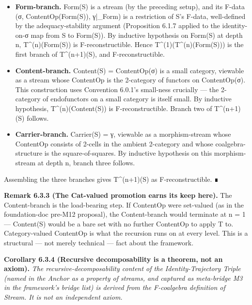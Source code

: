 \documentclass[11pt, openany]{book}
\begin{document}
\begin{itemize}
\item \textbf{Form-branch.} Form(S) is a stream (by the preceding setup), and its F-data (σ, ContentOp(Form(S)), γ|\_\allowbreak{}Form) is a restriction of S's F-data, well-defined by the adequacy-stability argument (Proposition 6.1.7 applied to the identity-on-σ map from S to Form(S)). By inductive hypothesis on Form(S) at depth n, T\textasciicircum{}(n)(Form(S)) is F-reconstructible. Hence T\textasciicircum{}(1)(T\textasciicircum{}(n)(Form(S))) is the first branch of T\textasciicircum{}(n+1)(S), and F-reconstructible.

\item \textbf{Content-branch.} Content(S) = ContentOp(σ) is a small category, viewable as a stream whose ContentOp is the 2-category of functors on ContentOp(σ). This construction uses Convention 6.0.1's small-ness crucially --- the 2-category of endofunctors on a small category is itself small. By inductive hypothesis, T\textasciicircum{}(n)(Content(S)) is F-reconstructible. Branch two of T\textasciicircum{}(n+1)(S) follows.

\item \textbf{Carrier-branch.} Carrier(S) = γ, viewable as a morphism-stream whose ContentOp consists of 2-cells in the ambient 2-category and whose coalgebra-structure is the square-of-squares. By inductive hypothesis on this morphism-stream at depth n, branch three follows.
\end{itemize}

Assembling the three branches gives T\textasciicircum{}(n+1)(S) as F-reconstructible. ∎

\textbf{Remark 6.3.3 (The Cat-valued promotion earns its keep here).} The Content-branch is the load-bearing step. If ContentOp were set-valued (as in the foundation-doc pre-M12 proposal), the Content-branch would terminate at n = 1 --- Content(S) would be a bare set with no further ContentOp to apply T to. Category-valued ContentOp is what the recursion runs on at every level. This is a structural --- not merely technical --- fact about the framework.

\textbf{Corollary 6.3.4 (Recursive decomposability is a theorem, not an axiom).} \textit{The recursive-decomposability content of the Identity-Trajectory Triple (named in the Anchor as a property of streams, and captured as meta-bridge M3 in the framework's bridge list) is derived from the F-coalgebra definition of Stream. It is not an independent axiom.}
\end{document}
